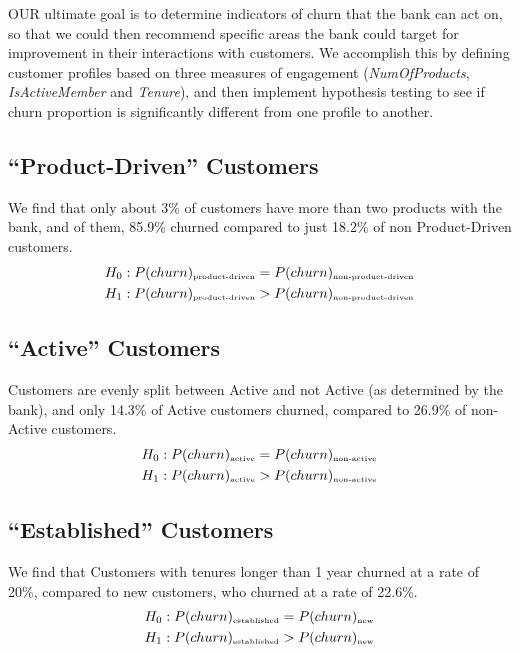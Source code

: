 \documentclass[twoside,twocolumn]{article}
\begin{document}
\lettrine[nindent=0em,lines=2]{O}UR ultimate goal is to determine indicators of churn that the bank can act on, so that we could then recommend specific areas the bank could target for improvement in their interactions with customers. We accomplish this by defining customer profiles based on three measures of engagement (\textit{NumOfProducts}, \textit{IsActiveMember} and \textit{Tenure}), and then implement hypothesis testing to see if churn proportion is significantly different from one profile to another.

\subsection*{``Product-Driven'' Customers}
We find that only about 3\% of customers have more than two products with the bank, and of them, 85.9\% churned compared to just 18.2\% of non Product-Driven customers.
\begin{align*}
  H_0: P(churn)_{\text{\tiny{product-driven}}} &= P(churn)_{\text{\tiny{non-product-driven}}}\\
  H_1: P(churn)_{\text{\tiny{product-driven}}} &> P(churn)_{\text{\tiny{non-product-driven}}}
\end{align*}

\subsection*{``Active'' Customers}
Customers are evenly split between Active and not Active (as determined by the bank), and only 14.3\% of Active customers churned, compared to 26.9\% of non-Active customers.
\begin{align*}
  H_0: P(churn)_{\text{\tiny{active}}} &= P(churn)_{\text{\tiny{non-active}}}\\
  H_1: P(churn)_{\text{\tiny{active}}} &> P(churn)_{\text{\tiny{non-active}}}
\end{align*}

\subsection*{``Established'' Customers}
We find that Customers with tenures longer than 1 year churned at a rate of 20\%, compared to new customers, who churned at a rate of 22.6\%.
\begin{align*}
  H_0: P(churn)_{\text{\tiny{established}}} &= P(churn)_{\text{\tiny{new}}}\\
  H_1: P(churn)_{\text{\tiny{established}}} &> P(churn)_{\text{\tiny{new}}}
\end{align*}
\end{document}
